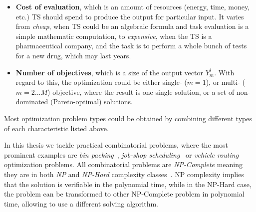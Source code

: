 \begin{itemize}
	\item \textbf{Cost of evaluation}, which is an amount of resources (energy, time, money, etc.) TS should spend to produce the output for particular input. It varies from \emph{cheap}, when TS could be an algebraic formula and task evaluation is a simple mathematic computation, to \emph{expensive}, when the TS is a pharmaceutical company, and the task is to perform a whole bunch of tests for a new drug, which may last years. 

	\item \textbf{Number of objectives}, which is a size of the output vector $Y_m^i$. With regard to this, the optimization could be either single- ($m=1$), or multi- ($m=2...M$) objective, where the result is one single solution, or a set of non-dominated (Pareto-optimal) solutions.
\end{itemize}

Most optimization problem types could be obtained by combining different types of each characteristic listed above.

In this thesis we tackle practical combinatorial problems, where the most prominent examples are \emph{bin packing}~\cite{martello1990bin}, \emph{job-shop scheduling}~\cite{blazewicz1996job} or \emph{vehicle routing}~\cite{toth2002vehicle} optimization problems.
All combinatorial problems are \emph{NP-Complete} meaning they are in both \emph{NP} and \emph{NP-Hard} complexity classes~\cite{garey1979computers}. NP complexity implies that the solution is verifiable in the polynomial time, while in the NP-Hard case, the problem can be transformed to other NP-Complete problem in polynomial time, allowing to use a different solving algorithm.

